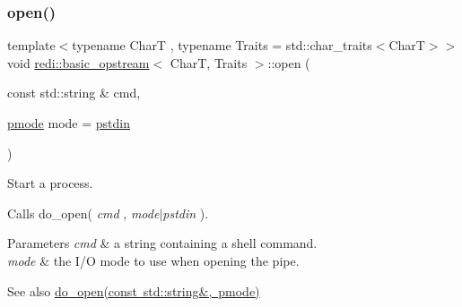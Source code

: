 \subsubsection{\texorpdfstring{open()}{open()}\hspace{0.1cm}{\footnotesize\ttfamily [1/2]}}
{\footnotesize\ttfamily template$<$typename CharT , typename Traits  = std\+::char\+\_\+traits$<$\+Char\+T$>$$>$ \\
void \mbox{\hyperlink{classredi_1_1basic__opstream}{redi\+::basic\+\_\+opstream}}$<$ CharT, Traits $>$\+::open (\begin{DoxyParamCaption}\item[{const std\+::string \&}]{cmd,  }\item[{\mbox{\hyperlink{structredi_1_1pstreams_a1eae4aad88812af03a0fbb3ec13c50b7}{pmode}}}]{mode = {\ttfamily \mbox{\hyperlink{structredi_1_1pstreams_a7a976ce992db857f86a0cc3352e42d3a}{pstdin}}} }\end{DoxyParamCaption})\hspace{0.3cm}{\ttfamily [inline]}}



Start a process. 

Calls do\+\_\+open( {\itshape cmd} , {\itshape mode$\vert$pstdin} ).


\begin{DoxyParams}{Parameters}
{\em cmd} & a string containing a shell command. \\
\hline
{\em mode} & the I/O mode to use when opening the pipe. \\
\hline
\end{DoxyParams}
\begin{DoxySeeAlso}{See also}
\mbox{\hyperlink{classredi_1_1pstream__common_a2505ab3e3a834b92d98b5bcb97734dfe}{do\+\_\+open(const std\+::string\&, pmode)}} 
\end{DoxySeeAlso}
\mbox{\label{classredi_1_1basic__opstream_a0e19af861168cde3fc595c47b81ca47a}} 
